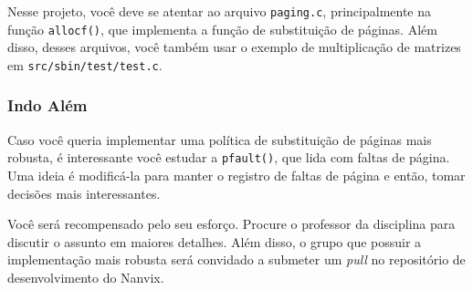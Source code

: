 \documentclass[11pt]{article}
\newif\ifen
\begin{document}
	Nesse projeto, você deve se atentar ao arquivo \texttt{paging.c},
	principalmente na função \texttt{allocf()}, que implementa a função
	de substituição de páginas. Além disso, desses arquivos, você também
	usar o exemplo de multiplicação de matrizes em
	\texttt{src/sbin/test/test.c}.

	\subsubsection*{Indo Além}

		Caso você queria implementar uma política de substituição de
		páginas mais robusta, é interessante você estudar a
		\texttt{pfault()}, que lida com faltas de página. Uma ideia é
		modificá-la para manter o registro de faltas de página e então,
		tomar decisões mais interessantes.

		Você será recompensado pelo seu esforço. Procure o professor da
		disciplina para discutir o assunto em maiores detalhes. Além
		disso, o grupo que possuir a implementação mais robusta será
		convidado a submeter um \textit{pull} no repositório de
		desenvolvimento do Nanvix.

\else\ifen
	\subsubsection*{Start Point}

		The implementation of the memory management subsystem is in the
		\texttt{kernel/mm} directory, and it is split in several files:
		\begin{itemize}
			\item \texttt{mm.c}: inicialização do gerenciador de memória.
			\item \texttt{paging.c}: sistema de paginação e \textit{swapping}.
			\item \texttt{region.c}: gerenciamento de regiões.
		\end{itemize}
		
		In this assignment, you should focus on the \texttt{paging.c}
		source file. More precisely, in the \texttt{allocf()} kernel
		function, which implements the paging replacement algorithm.
		Besides this, the source file for the matrix multiplication
		algorithm is located in \texttt{src/sbin/test/test.c}
\fi\fi
\end{document}
